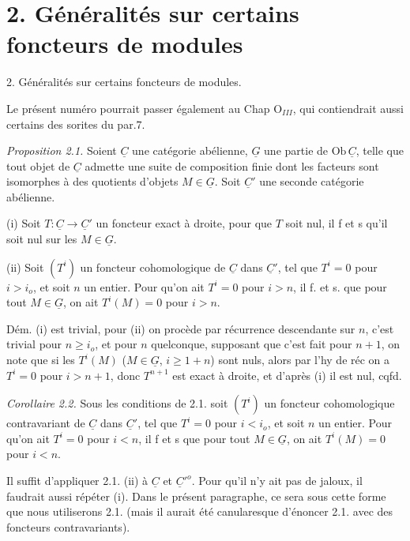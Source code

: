 \documentclass[11pt,a4paper]{article}
\begin{document}
\section{2. Généralités sur certains foncteurs de modules}

2. Généralités sur certains foncteurs de modules.

Le présent numéro pourrait passer également au \struck{\ill{}} Chap $\mathrm{O}_{III}$, qui contiendrait aussi certains des sorites du par.7.

\emph{Proposition 2.1.} Soient $\underline{C}$ une catégorie abélienne, $\underline{G}$ une partie de $\mathrm{Ob}\,\underline{C}$, telle que tout objet de $\underline{C}$ admette une suite de composition finie dont les  facteurs  sont isomorphes à des quotients d'objets $M \in \underline{G}$. \struck{\ill{}} Soit $\underline{C}'$ une seconde catégorie abélienne.

(i) Soit $T : \underline{C} \to \underline{C}'$ un foncteur \struck{\ill{}} exact à droite, pour que $T$ soit nul, il f et s qu'il soit nul sur les $M \in \underline{G}$.

(ii) Soit $(T^i)$ un foncteur cohomologique de $\underline{C}$ dans $\underline{C}'$, tel que $T^i = 0$ pour $i > i_o$, et soit $n$ un entier. Pour qu'on ait $T^i = 0$ pour $i > n$, il f. et s. que pour tout $M \in \underline{G}$, on ait $T^i(M) = 0$ pour $i > n$.

Dém. (i) est trivial, pour (ii) on procède par récurrence descendante  sur $n$, c'est trivial pour $n \geqslant i_o$, et pour $n$ quelconque, supposant que c'est fait pour $n+1$, on note que si les $T^i(M)$ ($M \in \underline{G}$, $i \geqslant 1+n$) sont nuls, alors par l'hy de réc on a $T^i = 0$ pour $i > n+1$, donc $T^{n+1}$ est exact à droite, et d'après (i) il est nul, cqfd.

\emph{Corollaire 2.2.}  Sous les conditions de 2.1. soit $(T^i)$ un foncteur cohomologique contravariant de $\underline{C}$ dans $\underline{C}'$, tel que $T^i = 0$ pour $i < i_o$, et soit $n$ un entier. Pour qu'on ait $T^i = 0$ pour $i < n$, il f et s que pour tout $M \in \underline{G}$, on ait $T^i(M) = 0$ pour $i < n$.

Il suffit d'appliquer 2.1. (ii) à $\underline{C}$ et $\underline{C}'^{o}$. Pour qu'il n'y ait pas de jaloux, il faudrait aussi répéter (i). Dans le présent paragraphe, ce sera sous cette forme que nous utiliserons 2.1. (mais il aurait été canularesque d'énoncer 2.1. avec des foncteurs contravariants).
\end{document}
